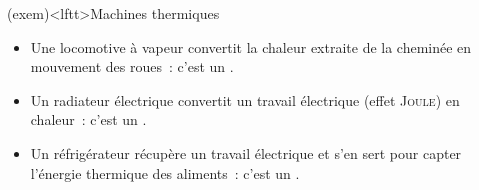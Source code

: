 \documentclass[../../main/main.tex]{subfiles}
\begin{document}
\begin{tcb}(exem)<lftt>{Machines thermiques}
	\begin{itemize}
		\item Une locomotive à vapeur convertit la chaleur extraite de la cheminée
		      en mouvement des roues~: c'est un .
		\item Un radiateur électrique convertit un travail électrique (effet
		      \textsc{Joule}) en chaleur~: c'est un .
		\item Un réfrigérateur récupère un travail électrique et s'en sert pour
		      capter l'énergie thermique des aliments~: c'est un
		      .
	\end{itemize}
\end{tcb}

\vspace{-25pt}
\end{document}
